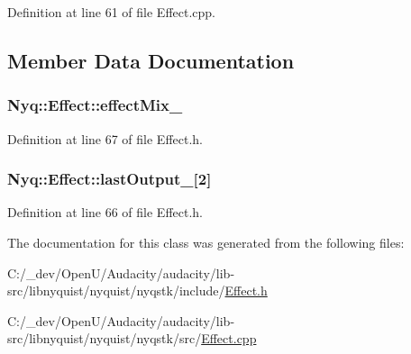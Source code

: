 Definition at line 61 of file Effect.\+cpp.



\subsection{Member Data Documentation}
\subsubsection[{\texorpdfstring{effect\+Mix\+\_\+}{effectMix_}}]{ Nyq\+::\+Effect\+::effect\+Mix\+\_\+\hspace{0.3cm}{\ttfamily [protected]}}\hypertarget{class_nyq_1_1_effect_a76a7136b69ce6d3c8965e72d0bb27646}{}\label{class_nyq_1_1_effect_a76a7136b69ce6d3c8965e72d0bb27646}


Definition at line 67 of file Effect.\+h.

\subsubsection[{\texorpdfstring{last\+Output\+\_\+}{lastOutput_}}]{ Nyq\+::\+Effect\+::last\+Output\+\_\+\mbox{[}2\mbox{]}\hspace{0.3cm}{\ttfamily [protected]}}\hypertarget{class_nyq_1_1_effect_acdc44603efdb9afd384f2e1859112f76}{}\label{class_nyq_1_1_effect_acdc44603efdb9afd384f2e1859112f76}


Definition at line 66 of file Effect.\+h.



The documentation for this class was generated from the following files\+:\begin{DoxyCompactItemize}
\item 
C\+:/\+\_\+dev/\+Open\+U/\+Audacity/audacity/lib-\/src/libnyquist/nyquist/nyqstk/include/\hyperlink{lib-src_2libnyquist_2nyquist_2nyqstk_2include_2_effect_8h}{Effect.\+h}\item 
C\+:/\+\_\+dev/\+Open\+U/\+Audacity/audacity/lib-\/src/libnyquist/nyquist/nyqstk/src/\hyperlink{lib-src_2libnyquist_2nyquist_2nyqstk_2src_2_effect_8cpp}{Effect.\+cpp}\end{DoxyCompactItemize}
